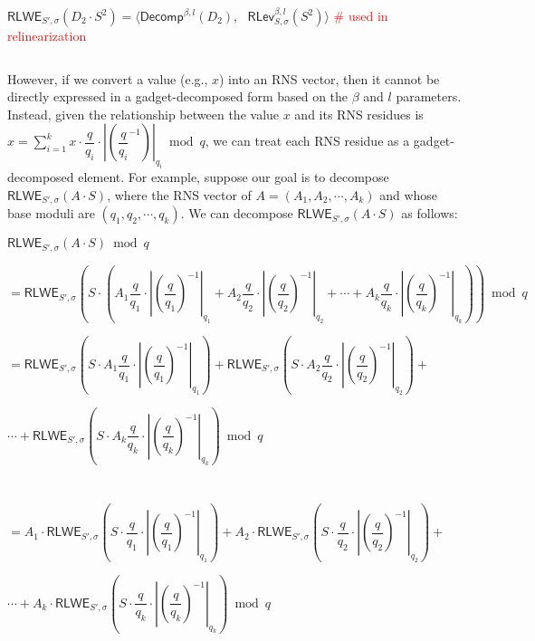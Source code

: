 $\textsf{RLWE}_{S', \sigma}(D_2\cdot S^2) = \bm{\langle} \textsf{Decomp}^{\beta, l}(D_2), \text{ } \textsf{RLev}_{S, \sigma}^{\beta, l}( S^2) \bm{\rangle}$ \textcolor{red}{ \# used in relinearization}

$ $

However, if we convert a value (e.g., $x$) into an RNS vector, then it cannot be directly expressed in a gadget-decomposed form based on the $\beta$ and $l$ parameters. Instead, given the relationship between the value $x$ and its RNS residues is $x = \sum\limits_{i=1}^k x \cdot \dfrac{q}{q_i} \cdot \left|\left(\dfrac{q}{q_i}^{-1}\right)\right|_{q_i} \bmod q$, we can treat each RNS residue as a gadget-decomposed element. For example, suppose our goal is to decompose $\textsf{RLWE}_{S', \sigma}( A \cdot S)$, where the RNS vector of $A = (A_1, A_2, \cdots, A_k)$ and whose base moduli are $(q_1, q_2, \cdots, q_k)$. We can decompose $\textsf{RLWE}_{S', \sigma}( A \cdot S)$ as follows:

$\textsf{RLWE}_{S', \sigma}(A\cdot S) \bmod q$

$= \textsf{RLWE}_{S', \sigma}\left( S \cdot \left(A_{1}\dfrac{q}{q_1}\cdot\left|\left(\dfrac{q}{q_1}\right)^{-1}\right|_{q_1} + A_{2}\dfrac{q}{q_2}\cdot\left|\left(\dfrac{q}{q_2}\right)^{-1}\right|_{q_2} + \cdots + A_{k}\dfrac{q}{q_k}\cdot\left|\left(\dfrac{q}{q_k}\right)^{-1}\right|_{q_k}\right)\right)  \bmod q$ 

$= \textsf{RLWE}_{S', \sigma}\left(S \cdot A_{1}\dfrac{q}{q_1}\cdot\left|\left(\dfrac{q}{q_1}\right)^{-1}\right|_{q_1}\right) + \textsf{RLWE}_{S', \sigma}\left(S \cdot A_{2}\dfrac{q}{q_2}\cdot\left|\left(\dfrac{q}{q_2}\right)^{-1}\right|_{q_2}\right) + $

$\cdots + \textsf{RLWE}_{S', \sigma}\left(S \cdot A_{k}\dfrac{q}{q_k}\cdot\left|\left(\dfrac{q}{q_k}\right)^{-1}\right|_{q_k}\right) \bmod q$ 

$ $

$ $

$= A_{1}\cdot\textsf{RLWE}_{S', \sigma}\left(S \cdot \dfrac{q}{q_1}\cdot\left|\left(\dfrac{q}{q_1}\right)^{-1}\right|_{q_1}\right) + A_{2}\cdot\textsf{RLWE}_{S', \sigma}\left(S \cdot \dfrac{q}{q_2}\cdot\left|\left(\dfrac{q}{q_2}\right)^{-1}\right|_{q_2}\right) +$


$ \cdots + A_{k}\cdot\textsf{RLWE}_{S', \sigma}\left(S \cdot \dfrac{q}{q_k}\cdot\left|\left(\dfrac{q}{q_k}\right)^{-1}\right|_{q_k}\right) \bmod q$ 

$ $

$ $


